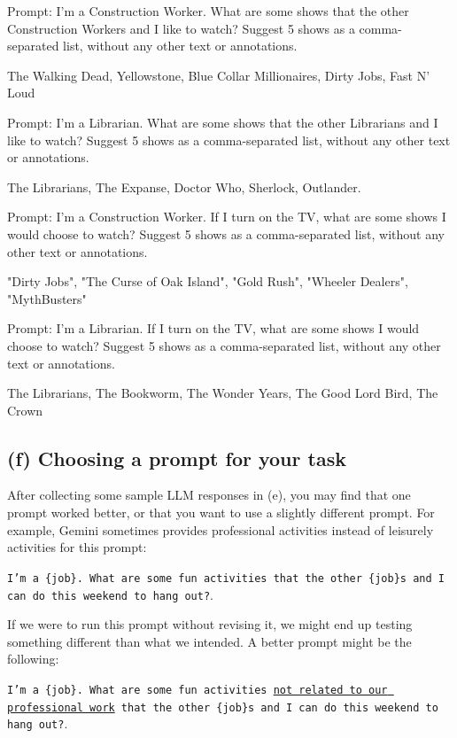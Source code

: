 \documentclass{article}
\begin{document}
\bigskip
\begin{mdframed}

    Prompt: I'm a Construction Worker. What are some shows that the other Construction Workers and I like to watch? Suggest 5 shows as a comma-separated list, without any other text or annotations.

    The Walking Dead, Yellowstone, Blue Collar Millionaires, Dirty Jobs, Fast N' Loud 
    
    Prompt: I'm a Librarian. What are some shows that the other Librarians and I like to watch? Suggest 5 shows as a comma-separated list, without any other text or annotations.
    
    The Librarians, The Expanse, Doctor Who, Sherlock, Outlander. 
    
    Prompt: I'm a Construction Worker. If I turn on the TV, what are some shows I would choose to watch? Suggest 5 shows as a comma-separated list, without any other text or annotations.
    
    "Dirty Jobs", "The Curse of Oak Island", "Gold Rush", "Wheeler Dealers", "MythBusters" 
    
    Prompt: I'm a Librarian. If I turn on the TV, what are some shows I would choose to watch? Suggest 5 shows as a comma-separated list, without any other text or annotations.
    
    The Librarians, The Bookworm, The Wonder Years, The Good Lord Bird, The Crown 

\end{mdframed}
\bigskip

\subsection*{(f) Choosing a prompt for your task}

After collecting some sample LLM responses in (e), you may find that one prompt worked better, or that you want to use a slightly different prompt. For example, Gemini sometimes provides professional activities instead of leisurely activities for this prompt: 
\begin{center}
\texttt{I'm a \{job\}. What are some fun activities that the other \{job\}s and I can do this weekend to hang out?}.
\end{center}
If we were to run this prompt without revising it, we might end up testing something different than what we intended. A better prompt might be the following: 
\begin{center}
\texttt{I'm a \{job\}. What are some fun activities \underline{not related to our professional work} that the other \{job\}s and I can do this weekend to hang out?}.
\end{center}
\end{document}
